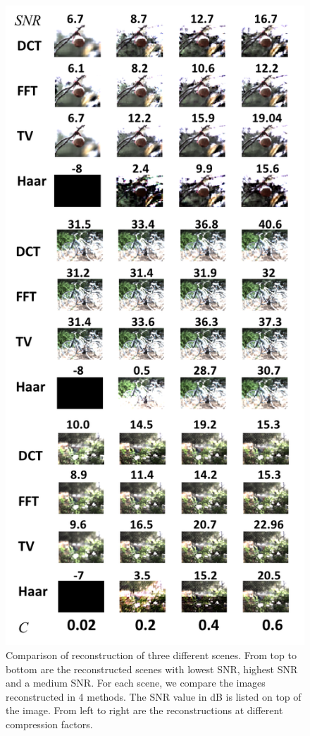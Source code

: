 \documentclass[10pt,twocolumn,letterpaper]{article}
\begin{document}
\begin{figure}[t]
\begin{center}
 \includegraphics[width=0.95\linewidth]{img/example_images.png}
\end{center}
   \caption{Comparison of reconstruction of three different scenes. From top to bottom are the reconstructed scenes with lowest SNR, highest SNR and a medium SNR. For each scene, we compare the images reconstructed in 4 methods. The SNR value in dB is listed on top of the image. From left to right are the reconstructions at different compression factors.}
\end{figure}
\end{document}
